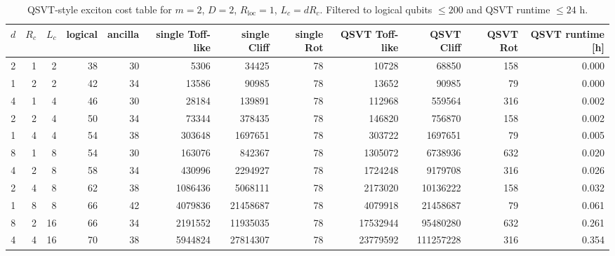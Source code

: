 \begin{table}[t]
\centering
\scriptsize
\caption{QSVT-style exciton cost table for $m=2$, $D=2$, $R_{\mathrm{loc}}=1$, $L_c=dR_c$. Filtered to logical qubits $\leq 200$ and QSVT runtime $\leq 24$ h.}
\begin{tabularx}{\linewidth}{rrrrrrrrrrrr}
\toprule
$d$ & $R_c$ & $L_c$ & logical & ancilla & single Toff-like & single Cliff & single Rot & QSVT Toff-like & QSVT Cliff & QSVT Rot & QSVT runtime [h] \\
\midrule
2 & 1 & 2 & 38 & 30 & 5306 & 34425 & 78 & 10728 & 68850 & 158 & 0.000 \\
1 & 2 & 2 & 42 & 34 & 13586 & 90985 & 78 & 13652 & 90985 & 79 & 0.000 \\
4 & 1 & 4 & 46 & 30 & 28184 & 139891 & 78 & 112968 & 559564 & 316 & 0.002 \\
2 & 2 & 4 & 50 & 34 & 73344 & 378435 & 78 & 146820 & 756870 & 158 & 0.002 \\
1 & 4 & 4 & 54 & 38 & 303648 & 1697651 & 78 & 303722 & 1697651 & 79 & 0.005 \\
8 & 1 & 8 & 54 & 30 & 163076 & 842367 & 78 & 1305072 & 6738936 & 632 & 0.020 \\
4 & 2 & 8 & 58 & 34 & 430996 & 2294927 & 78 & 1724248 & 9179708 & 316 & 0.026 \\
2 & 4 & 8 & 62 & 38 & 1086436 & 5068111 & 78 & 2173020 & 10136222 & 158 & 0.032 \\
1 & 8 & 8 & 66 & 42 & 4079836 & 21458687 & 78 & 4079918 & 21458687 & 79 & 0.061 \\
8 & 2 & 16 & 66 & 34 & 2191552 & 11935035 & 78 & 17532944 & 95480280 & 632 & 0.261 \\
4 & 4 & 16 & 70 & 38 & 5944824 & 27814307 & 78 & 23779592 & 111257228 & 316 & 0.354 \\
\bottomrule
\end{tabularx}
\end{table}
